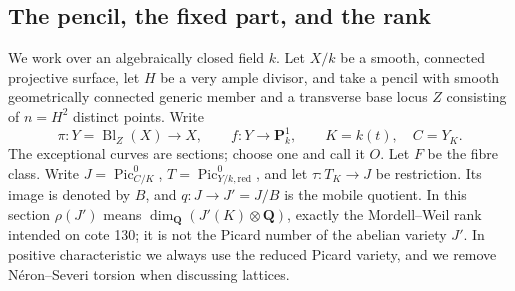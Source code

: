 \subsection{The pencil, the fixed part, and the rank}

We work over an algebraically closed field $k$.  Let $X/k$ be a smooth,
connected projective surface, let $H$ be a very ample divisor, and take a
pencil with smooth geometrically connected generic member and a transverse
base locus $Z$ consisting of $n=H^2$ distinct points.  Write
\[
 \pi:Y=\operatorname{Bl}_Z(X)\longrightarrow X,\qquad
 f:Y\longrightarrow\mathbf P^1_k,\qquad K=k(t),\quad C=Y_K.
\]
The exceptional curves are sections; choose one and call it $O$.
Let $F$ be the fibre class.  Write $J=\operatorname{Pic}^0_{C/K}$,
$T=\operatorname{Pic}^0_{Y/k,\mathrm{red}}$, and let
$\tau:T_K\to J$ be restriction.  Its image is denoted by $B$, and
$q:J\to J'=J/B$ is the mobile quotient.  In this section
$\rho(J')$ means $\dim_{\mathbf Q}(J'(K)\otimes\mathbf Q)$, exactly the
Mordell--Weil rank intended on cote 130; it is not the Picard number of
the abelian variety $J'$.  In positive characteristic we always use the
reduced Picard variety, and we remove N\'eron--Severi torsion when discussing
lattices.

